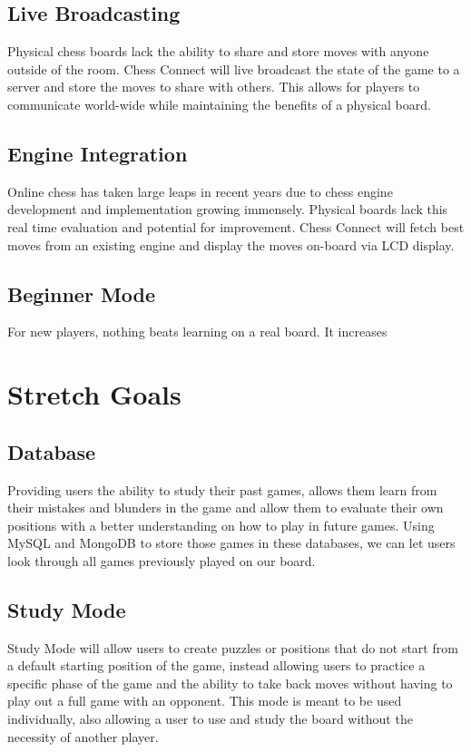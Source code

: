 \documentclass{article}
\begin{document}
\subsection{Live Broadcasting}
{Physical chess boards lack the ability to share and store moves with anyone outside of the room. Chess Connect will live broadcast the state of the game to a server and store the moves to share with others. This allows for players to communicate world-wide while maintaining the benefits of a physical board.} 
\subsection{Engine Integration}
{Online chess has taken large leaps in recent years due to chess engine development and implementation growing immensely. Physical boards lack this real time evaluation and potential for improvement. Chess Connect will fetch best moves from an existing engine and display the moves on-board via LCD display.}
\subsection{Beginner Mode}
{For new players, nothing beats learning on a real board. It increases }

\section{Stretch Goals}
\subsection{Database}
Providing users the ability to study their past games, allows them learn from their mistakes and blunders in the game and allow them to evaluate their own positions with a better understanding on how to play in future games. Using MySQL and MongoDB to store those games in these databases, we can let users look through all games previously played on our board.
\subsection{Study Mode}
Study Mode will allow users to create puzzles or positions that do not start from a default starting position of the game, instead allowing users to practice a specific phase of the game and the ability to take back moves without having to play out a full game with an opponent. This mode is meant to be used individually, also allowing a user to use and study the board without the necessity of another player.
\end{document}
